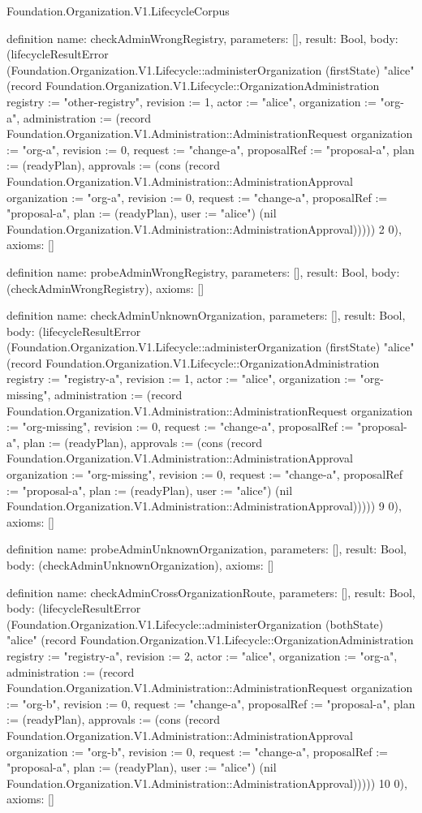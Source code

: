 \begin{lexlean}{Foundation.Organization.V1.LifecycleCorpus}
\begin{semanticmodule}
definition{
  name: checkAdminWrongRegistry,
  parameters: [],
  result: Bool,
  body: (lifecycleResultError (Foundation.Organization.V1.Lifecycle::administerOrganization (firstState) "alice" (record Foundation.Organization.V1.Lifecycle::OrganizationAdministration {registry := "other-registry", revision := 1, actor := "alice", organization := "org-a", administration := (record Foundation.Organization.V1.Administration::AdministrationRequest {organization := "org-a", revision := 0, request := "change-a", proposalRef := "proposal-a", plan := (readyPlan), approvals := (cons (record Foundation.Organization.V1.Administration::AdministrationApproval {organization := "org-a", revision := 0, request := "change-a", proposalRef := "proposal-a", plan := (readyPlan), user := "alice"}) (nil Foundation.Organization.V1.Administration::AdministrationApproval))})})) 2 0),
  axioms: []
}

definition{
  name: probeAdminWrongRegistry,
  parameters: [],
  result: Bool,
  body: (checkAdminWrongRegistry),
  axioms: []
}

definition{
  name: checkAdminUnknownOrganization,
  parameters: [],
  result: Bool,
  body: (lifecycleResultError (Foundation.Organization.V1.Lifecycle::administerOrganization (firstState) "alice" (record Foundation.Organization.V1.Lifecycle::OrganizationAdministration {registry := "registry-a", revision := 1, actor := "alice", organization := "org-missing", administration := (record Foundation.Organization.V1.Administration::AdministrationRequest {organization := "org-missing", revision := 0, request := "change-a", proposalRef := "proposal-a", plan := (readyPlan), approvals := (cons (record Foundation.Organization.V1.Administration::AdministrationApproval {organization := "org-missing", revision := 0, request := "change-a", proposalRef := "proposal-a", plan := (readyPlan), user := "alice"}) (nil Foundation.Organization.V1.Administration::AdministrationApproval))})})) 9 0),
  axioms: []
}

definition{
  name: probeAdminUnknownOrganization,
  parameters: [],
  result: Bool,
  body: (checkAdminUnknownOrganization),
  axioms: []
}

definition{
  name: checkAdminCrossOrganizationRoute,
  parameters: [],
  result: Bool,
  body: (lifecycleResultError (Foundation.Organization.V1.Lifecycle::administerOrganization (bothState) "alice" (record Foundation.Organization.V1.Lifecycle::OrganizationAdministration {registry := "registry-a", revision := 2, actor := "alice", organization := "org-a", administration := (record Foundation.Organization.V1.Administration::AdministrationRequest {organization := "org-b", revision := 0, request := "change-a", proposalRef := "proposal-a", plan := (readyPlan), approvals := (cons (record Foundation.Organization.V1.Administration::AdministrationApproval {organization := "org-b", revision := 0, request := "change-a", proposalRef := "proposal-a", plan := (readyPlan), user := "alice"}) (nil Foundation.Organization.V1.Administration::AdministrationApproval))})})) 10 0),
  axioms: []
}


\end{semanticmodule}
\end{lexlean}
